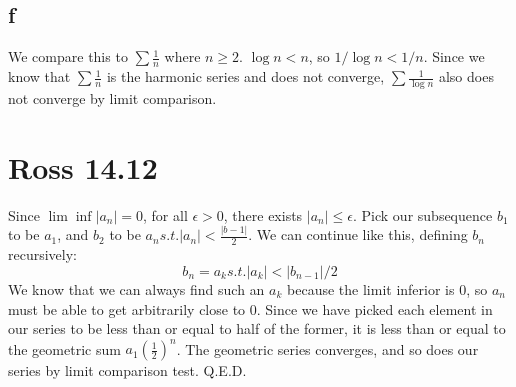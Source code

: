 \documentclass[12pt]{article}
\begin{document}
\subsection{f}
We compare this to $\sum \frac{1}{n}$ where $n \geq 2$. $\log n < n$, so $1/\log n < 1/ n$. Since we know that $\sum \frac{1}{n}$ is the harmonic series and does not converge, $\sum \frac{1}{\log n}$ also does not converge by limit comparison.
\newpage


\section{Ross 14.12}
Since $\lim \inf |a_n|=0$, for all $\epsilon > 0$, there exists $|a_n|\leq \epsilon$.
\newline
Pick our subsequence $b_1$ to be $a_1$, and $b_2$ to be $a_n s.t. |a_n|<\frac{|b-1|}{2}$. We can continue like this, defining $b_n$ recursively:
$$b_n = a_k s.t. |a_k|<|b_{n-1}|/2$$
We know that we can always find such an $a_k$ because the limit inferior is 0, so $a_n$ must be able to get arbitrarily close to 0.
\newline
Since we have picked each element in our series to be less than or equal to half of the former, it is less than or equal to the geometric sum $a_1(\frac{1}{2})^n$. The geometric series converges, and so does our series by limit comparison test.
Q.E.D.
\end{document}
